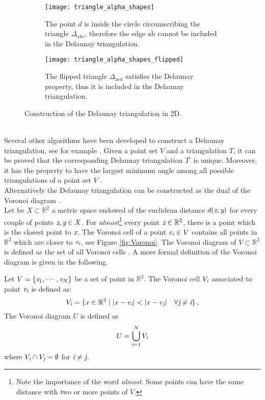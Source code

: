 \begin{figure}[t]\label{fig:Delaunay}
\begin{subfigure}[t]{0.48\textwidth}
\centering
\texttt{[image: triangle\_alpha\_shapes]}
\label{fig:shape}
\caption{The point $d$ is inside the circle circumscribing the triangle $\Delta_{\textrm{abc}}$, therefore the edge $\overline{\textrm{ab}}$ cannot be included in the Delaunay triangulation.}
\end{subfigure}
\hfill
\begin{subfigure}[t]{0.48\textwidth}
\centering
\texttt{[image: triangle\_alpha\_shapes\_flipped]}
\caption{The flipped triangle $\Delta_{\textrm{acd}}$ satisfies the Delaunay property, thus it is included in the Delaunay triangulation.}
\end{subfigure}
\caption{Construction of the Delaunay triangulation in 2D.}
\label{fig:Delaunay}
\end{figure}
\\ \indent Several other algorithms have been developed to construct a Delaunay triangulation, see for example \cite{lee1980two, renka1997algorithm}.
 Given a point set $V$ and a triangulation $T$, it can be proved that the corresponding Delaunay triangulation $T^\prime$ is unique. Moreover, it has the property to have the largest minimum angle among all possible triangulations of a point set $V$ \cite{press2007numerical}.
\\ \indent Alternatively the Delaunay triangulation can be constructed as the dual of the Voronoi diagram \cite{fortune1992voronoi}.\\\indent Let be $X\subset\mathbb{R}^2$ a metric space endowed of the euclidean distance $d(\textit{x}, \textit{y})$ for every couple of points $\textit{x}, \textit{y}\in X$. For \textit{almost}\footnote{Note the importance of the word \textit{almost}. Some points can have the same distance with two or more points of $V$.} every point $\textit{x}\in \mathbb{R}^2$, there is a point which is the closest point to $\textit{x}$. The Voronoi cell of a point $v_{\textit{i}}\in V$ contains all points in $\mathbb{R}^2$ which are closer to $\textit{v}_{\textit{i}}$, see Figure \ref{fig:Voronoi}. The Voronoi diagram of $V\subset \mathbb{R}^2$ is defined as the set of all Voronoi cells \cite{cazals2005conformal}. A more formal definition of the Voronoi diagram is given in the following.
\begin{defn}
Let $V=\{\textit{v}_1,\cdots,\textit{v}_N\}$ be a set of point in $\mathbb{R}^2$. The Voronoi cell $V_{\textit{i}}$ associated to point $\textit{v}_{\textit{i}}$ is defined as:
\begin{equation}
V_\variabile{i}=\{x\in \mathbb{R}^2\; | \;|x-v_\variabile{i}|<|x-v_\variabile{j}| \quad \forall \variabile{j}\neq \variabile{i} \}\,,
\end{equation}
The Voronoi diagram $U$ is defined as 
\begin{equation}
U = \bigcup_{\textit{i}=1}^N V_{\textit{i}}
\end{equation}
 where $V_{\textit{i}}\cap V_{\textit{j}}= \emptyset$ for $\textit{i}\neq\textit{j}$.
\end{defn}
